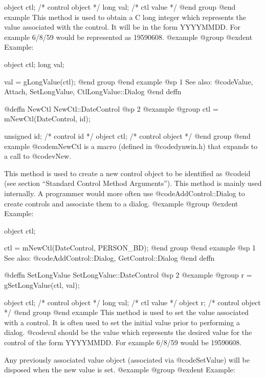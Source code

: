 {object  ctl;   /*  control object  */
long    val;   /*  ctl value       */
@end group
@end example
This method is used to obtain a C long integer which represents the
value associated with the control.  It will be in the form YYYYMMDD.
For example 6/8/59 would be represented as 19590608.
@example
@group
@exdent Example:

object  ctl;
long    val;

val = gLongValue(ctl);
@end group
@end example
@sp 1
See also:  @code{Value, Attach, SetLongValue, CtlLongValue::Dialog}
@end deffn










@deffn {NewCtl} NewCtl::DateControl
@sp 2
@example
@group
ctl = mNewCtl(DateControl, id);

unsigned  id;   /*  control id      */
object   ctl;   /*  control object  */
@end group
@end example
@code{mNewCtl} is a macro (defined in @code{dynwin.h}) that expands to
a call to @code{vNew}.

This method is used to create a new control object to be identified as
@code{id} (see section ``Standard Control Method Arguments'').  This
method is mainly used internally.  A programmer would more often
use @code{AddControl::Dialog} to create controls and associate them
to a dialog.
@example
@group
@exdent Example:

object  ctl;

ctl = mNewCtl(DateControl, PERSON_BD);
@end group
@end example
@sp 1
See also:  @code{AddControl::Dialog, GetControl::Dialog}
@end deffn










@deffn {SetLongValue} SetLongValue::DateControl
@sp 2
@example
@group
r = gSetLongValue(ctl, val);

object  ctl;    /*  control object  */
long    val;    /*  ctl value       */
object  r;      /*  control object  */
@end group
@end example
This method is used to set the value associated with a control.  It is
often used to set the initial value prior to performing a dialog.
@code{val} should be the value which represents the desired value for
the control of the form YYYYMMDD.  For example 6/8/59 would be
19590608.

Any previously associated value object (associated via @code{SetValue})
will be disposed when the new value is set.
@example
@group
@exdent Example:

}
